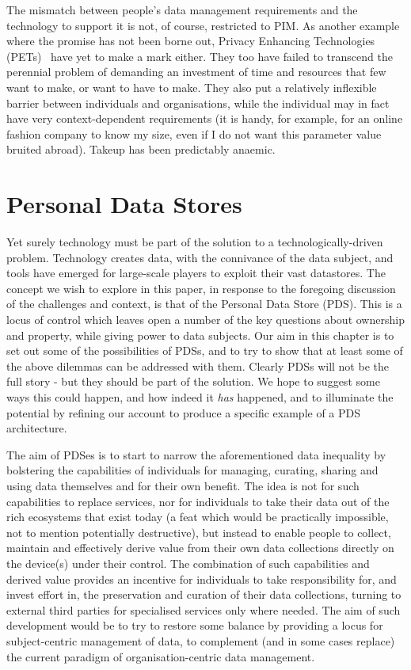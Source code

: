 \documentclass[graybox]{svmult}
\begin{document}
The mismatch between people’s data management requirements and the technology to support it is not, of course, restricted to PIM. As another example where the promise has not been borne out, Privacy Enhancing Technologies (PETs)~\cite{wang2006privacy} have yet to make a mark either. They too have failed to transcend the perennial problem of demanding an investment of time and resources that few want to make, or want to have to make. They also put a relatively inflexible barrier between individuals and organisations, while the individual may in fact have very context-dependent requirements (it is handy, for example, for an online fashion company to know my size, even if I do not want this parameter value bruited abroad). Takeup has been predictably anaemic.

\section{Personal Data Stores}

Yet surely technology must be part of the solution to a technologically-driven problem. Technology creates data, with the connivance of the data subject, and tools have emerged for large-scale players to exploit their vast datastores. The concept we wish to explore in this paper, in response to the foregoing discussion of the challenges and context, is that of the Personal Data Store (PDS). This is a locus of control which leaves open a number of the key questions about ownership and property, while giving power to data subjects. Our aim in this chapter is to set out some of the possibilities of PDSs, and to try to show that at least some of the above dilemmas can be addressed with them. Clearly PDSs will not be the full story - but they should be part of the solution. We hope to suggest some ways this could happen, and how indeed it {\em has} happened, and to illuminate the potential by refining our account to produce a specific example of a PDS architecture.

The aim of PDSes is to start to narrow the aforementioned data inequality by bolstering the capabilities of individuals for managing, curating, sharing and using data themselves and for their own benefit.  The idea is not for such capabilities to replace services, nor for individuals to take their data out of the rich ecosystems that exist today (a feat which would be practically impossible, not to mention potentially destructive), but instead to enable people to collect, maintain and effectively derive value from their own data collections directly on the device(s) under their control.  The combination of such capabilities and derived value provides an incentive for individuals to take responsibility for, and invest effort in, the preservation and curation of their data collections, turning to external third parties for specialised services only where needed.  The aim of such development would be to try to restore some balance by providing a locus for subject-centric management of data, to complement (and in some cases replace) the current paradigm of organisation-centric data management.
\end{document}
